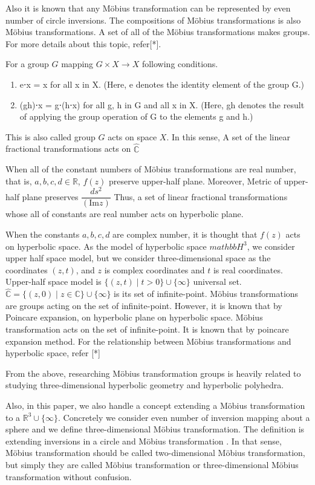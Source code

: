 Also it is known that any M\"obius transformation can be represented by
even number of circle inversions.
The compositions of M\"obius transformations is also M\"obius
transformations. A set of all of the M\"obius transformations makes
groups. For more details about this topic, refer[*].

For a group $G$ mapping $G \times X \to X$ following conditions.
\begin{enumerate}
 \item e⋅x = x for all x in X. (Here, e denotes the identity element of
       the group G.)
 \item (gh)⋅x = g⋅(h⋅x) for all g, h in G and all x in X.
       (Here, gh denotes the result of applying the group operation of G to the elements g and h.)
\end{enumerate}

This is also called group $G$ acts on space $X$.
In this sense, A set of the linear fractional transformations acts on
$\hat{\mathbb{C}}$

When all of the constant numbers of M\"obius transformations are real number,
that is, $a, b, c, d \in \mathbb{R}$, $f(z)$ preserve upper-half plane.
Moreover, Metric of upper-half plane preserves
$\dfrac{ds^2}{(\mathrm{Im}z)}$
Thus, a set of linear fractional transformations whose all of constants
are real number acts on hyperbolic plane.

When the constants $a, b, c, d$ are complex number, it is thought that
$f(z)$ acts on hyperbolic space.
As the model of hyperbolic space $mathbb{H}^3$, we consider upper half
space model, but we consider three-dimensional space as the coordinates
$(z, t)$, and $z$ is complex coordinates and $t$ is real coordinates.
Upper-half space model is $\{(z,t) \mid t>0\}\cup \{ \infty \}$
universal set.
$\hat{\mathbb{C}} = \{ (z,0) \mid z \in \mathbb{C}\} \cup \{ \infty\}$
is its set of infinite-point. M\"obius transformations are groups acting on
the set of infinite-point. However, it is known that by Poincare
expansion, on hyperbolic plane on hyperbolic space.
M\"obius transformation acts on the set of infinite-point. It is known
that by poincare expansion method.
For the relationship between M\"obius transformations and hyperbolic
space, refer [*]

From the above, researching M\"obius transformation groups is heavily
related to studying three-dimensional hyperbolic geometry and hyperbolic
polyhedra.

Also, in this paper, we also handle a concept extending a M\"obius
transformation to a $\mathbb{R}^3\cup\{\infty\}$.
Concretely we consider even number of inversion mapping about a sphere
and we define three-dimensional M\"obius transformation.
The definition is extending inversions in a circle and M\"obius
transformation .
In that sense, M\"obius transformation should be called two-dimensional
M\"obius transformation, but
simply they are called M\"obius transformation or three-dimensional M\"obius
transformation without confusion.


